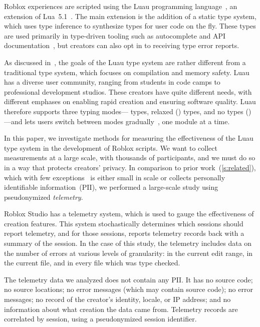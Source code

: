 \documentclass[english,submission,cleveref]{programming}
\begin{document}
{Roblox experiences} are scripted using the 
{Luau} programming language~\cite{luau-lang.org},
an extension of {Lua~5.1~\cite{lua}}.
The main extension is the addition of a static type system, which uses
type inference to synthesize types for user code on the fly.
These types are used primarily in type-driven tooling such as autocomplete and
API documentation~\cite{luau-autocomplete}, but creators can also opt in to
receiving type error reports.

As discussed in~\cite{bfj-hatra-2021},
the goals of the {Luau} type system are rather different from
a traditional type system, which focuses on compilation and memory safety.
{Luau} has a diverse user community, ranging from
students in code camps to professional development studios. These
creators have quite different needs, with different emphases on
enabling rapid creation and ensuring software quality.
{Luau} therefore supports three typing modes---\mstrict{} types,
relaxed (\mnonstrict{}) types, and no types (\mnocheck{})---and lets users switch
between modes gradually~\cite{st-sfp-2006,tfffgksst-snapl-2017}, one module at a time.

In this paper, we investigate methods for measuring the effectiveness
of the {Luau} type system in the development of {Roblox} scripts.
We want to collect measurements at a large scale, with thousands
of participants, and we must do so in a way that protects creators' privacy.
In comparison to prior work~(\cref{s:related}), which
with few exceptions~\cite{zhlbr-cc-2020,zhlbr-oopsla-2020,hlzbr-ecoop-2021} is either small in scale
or collects personally identifiable information~(PII),
we performed a large-scale study using pseudonymized \emph{telemetry}.

{Roblox Studio} has a telemetry system, which is used to gauge
the effectiveness of creation features. This system stochastically
determines which sessions should report telemetry, and for those
sessions, reports telemetry records back with a summary of the
session. In the case of this study, the telemetry includes data on the
number of errors at various levels of granularity: in the current edit
range, in the current file, and in every file which was type
checked.

The telemetry data we analyzed does not contain any PII.
It has no source code;
 no source locations;
no error messages (which may contain source code);
no error messages;
no record of the creator's identity, locale, or IP address;
and no information about what creation the data came from.
Telemetry records are correlated by session, using a pseudonymized
session identifier.
\end{document}

